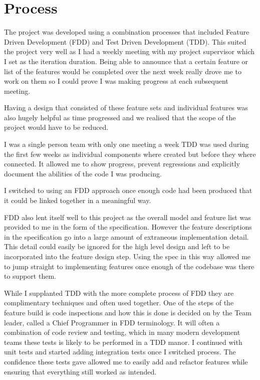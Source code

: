 \section{Process}
\label{sec:process}
The project was developed using a combination processes that included Feature Driven Development (FDD) and Test Driven Development (TDD).
This suited the project very well as I had a weekly meeting with my project supervisor which I set as the iteration duration.
Being able to announce that a certain feature or list of the features would be completed over the next week really drove me to work on them so I could prove I was making progress at each subsequent meeting.

Having a design that consisted of these feature sets and individual features was also hugely helpful as time progressed and we realised that the scope of the project would have to be reduced.

I was a single person team with only one meeting a week
TDD was used during the first few weeks as individual components where created but before they where connected.
It allowed me to show progress, prevent regressions and explicitly document the abilities of the code I was producing.

I switched to using an FDD approach once enough code had been produced that it could be linked together in a meaningful way.

FDD also lent itself well to this project as the overall model and feature list was provided to me in the form of the specification.
However the feature descriptions in the specification go into a large amount of extraneous implementation detail.
This detail could easily be ignored for the high level design and left to be incorporated into the feature design step.
Using the spec in this way allowed me to jump straight to implementing features once enough of the codebase was there to support them.

While I supplanted TDD with the more complete process of FDD they are complimentary techniques and often used together.
One of the steps of the feature build is code inspections and how this is done is decided on by the Team leader, called a Chief Programmer in FDD terminology.
It will often a combination of code review and testing, which in many modern development teams these tests is likely to be performed in a TDD manor.
I continued with unit tests and started adding integration tests once I switched process.
The confidence these tests gave allowed me to easily add and refactor features while ensuring that everything still worked as intended.  

